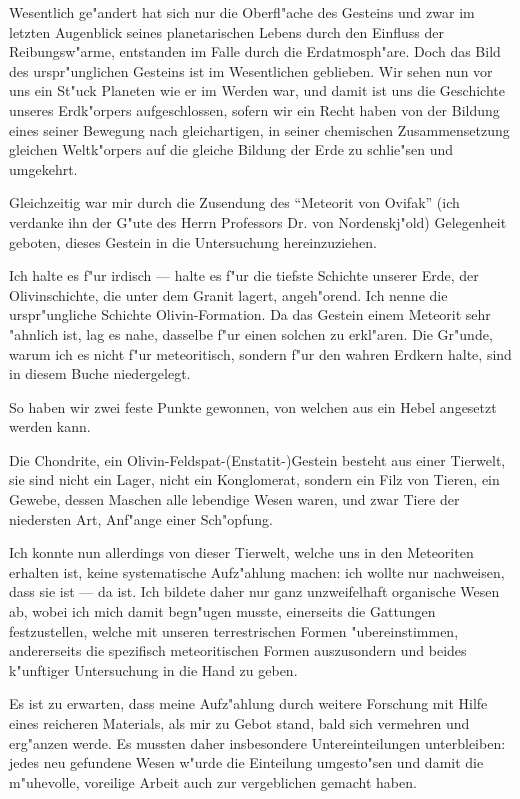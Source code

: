 \documentclass[a4paper, 11pt, oneside]{article}
\begin{document}
Wesentlich ge"andert hat sich nur die Oberfl"ache des Gesteins und zwar im letzten Augenblick seines planetarischen Lebens durch den Einfluss der Reibungsw"arme, entstanden im Falle durch die Erdatmosph"are. Doch das Bild des urspr"unglichen Gesteins ist im Wesentlichen geblieben. Wir sehen nun vor uns ein St"uck Planeten wie er im Werden war, und damit ist uns die Geschichte unseres Erdk"orpers aufgeschlossen, sofern wir ein Recht haben von der Bildung eines seiner Bewegung nach gleichartigen, in seiner chemischen Zusammensetzung gleichen Weltk"orpers auf die gleiche Bildung der Erde zu schlie"sen und umgekehrt.

Gleichzeitig war mir durch die Zusendung des "`Meteorit von Ovifak"' (ich verdanke ihn der G"ute des Herrn Professors Dr. von Nordenskj"old) Gelegenheit geboten, dieses Gestein in die Untersuchung hereinzuziehen.

Ich halte es f"ur irdisch --- halte es f"ur die tiefste Schichte unserer Erde, der Olivinschichte, die unter dem Granit lagert, angeh"orend. Ich nenne die urspr"ungliche Schichte Olivin-Formation. Da das Gestein einem Meteorit sehr "ahnlich ist, lag es nahe, dasselbe f"ur einen solchen zu erkl"aren. Die Gr"unde, warum ich es nicht f"ur meteoritisch, sondern f"ur den wahren Erdkern halte, sind in diesem Buche niedergelegt.

So haben wir zwei feste Punkte gewonnen, von welchen aus ein Hebel angesetzt werden kann.

Die Chondrite, ein Olivin-Feldspat-(Enstatit-)Gestein besteht aus einer Tierwelt, sie sind nicht ein Lager, nicht ein Konglomerat, sondern ein Filz von Tieren, ein Gewebe, dessen Maschen alle lebendige Wesen waren, und zwar Tiere der niedersten Art, Anf"ange einer Sch"opfung.

Ich konnte nun allerdings von dieser Tierwelt, welche uns in den Meteoriten erhalten ist, keine systematische Aufz"ahlung machen: ich wollte nur nachweisen, dass sie ist --- da ist. Ich bildete daher nur ganz unzweifelhaft organische Wesen ab, wobei ich mich damit begn"ugen musste, einerseits die Gattungen festzustellen, welche mit unseren terrestrischen Formen "ubereinstimmen, andererseits die spezifisch meteoritischen Formen auszusondern und beides k"unftiger Untersuchung in die Hand zu geben.

Es ist zu erwarten, dass meine Aufz"ahlung durch weitere Forschung mit Hilfe eines reicheren Materials, als mir zu Gebot stand, bald sich vermehren und erg"anzen werde. Es mussten daher insbesondere Untereinteilungen unterbleiben: jedes neu gefundene Wesen w"urde die Einteilung umgesto"sen und damit die m"uhevolle, voreilige Arbeit auch zur vergeblichen gemacht haben.
\end{document}
